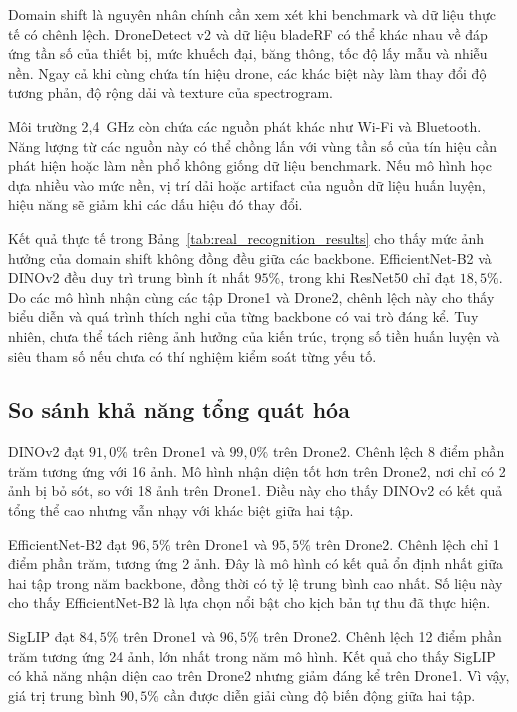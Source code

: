 \documentclass[../DoAn.tex]{subfiles}
\begin{document}
Domain shift là nguyên nhân chính cần xem xét khi benchmark và dữ liệu thực tế có chênh lệch. DroneDetect v2 và dữ liệu bladeRF có thể khác nhau về đáp ứng tần số của thiết bị, mức khuếch đại, băng thông, tốc độ lấy mẫu và nhiễu nền. Ngay cả khi cùng chứa tín hiệu drone, các khác biệt này làm thay đổi độ tương phản, độ rộng dải và texture của spectrogram.

Môi trường 2,4~GHz còn chứa các nguồn phát khác như Wi-Fi và Bluetooth. Năng lượng từ các nguồn này có thể chồng lấn với vùng tần số của tín hiệu cần phát hiện hoặc làm nền phổ không giống dữ liệu benchmark. Nếu mô hình học dựa nhiều vào mức nền, vị trí dải hoặc artifact của nguồn dữ liệu huấn luyện, hiệu năng sẽ giảm khi các dấu hiệu đó thay đổi.

Kết quả thực tế trong Bảng~\ref{tab:real_recognition_results} cho thấy mức ảnh hưởng của domain shift không đồng đều giữa các backbone. EfficientNet-B2 và DINOv2 đều duy trì trung bình ít nhất $95\%$, trong khi ResNet50 chỉ đạt $18,5\%$. Do các mô hình nhận cùng các tập Drone1 và Drone2, chênh lệch này cho thấy biểu diễn và quá trình thích nghi của từng backbone có vai trò đáng kể. Tuy nhiên, chưa thể tách riêng ảnh hưởng của kiến trúc, trọng số tiền huấn luyện và siêu tham số nếu chưa có thí nghiệm kiểm soát từng yếu tố.

\subsection{So sánh khả năng tổng quát hóa}

DINOv2 đạt $91,0\%$ trên Drone1 và $99,0\%$ trên Drone2. Chênh lệch 8 điểm phần trăm tương ứng với 16 ảnh. Mô hình nhận diện tốt hơn trên Drone2, nơi chỉ có 2 ảnh bị bỏ sót, so với 18 ảnh trên Drone1. Điều này cho thấy DINOv2 có kết quả tổng thể cao nhưng vẫn nhạy với khác biệt giữa hai tập.

EfficientNet-B2 đạt $96,5\%$ trên Drone1 và $95,5\%$ trên Drone2. Chênh lệch chỉ 1 điểm phần trăm, tương ứng 2 ảnh. Đây là mô hình có kết quả ổn định nhất giữa hai tập trong năm backbone, đồng thời có tỷ lệ trung bình cao nhất. Số liệu này cho thấy EfficientNet-B2 là lựa chọn nổi bật cho kịch bản tự thu đã thực hiện.

SigLIP đạt $84,5\%$ trên Drone1 và $96,5\%$ trên Drone2. Chênh lệch 12 điểm phần trăm tương ứng 24 ảnh, lớn nhất trong năm mô hình. Kết quả cho thấy SigLIP có khả năng nhận diện cao trên Drone2 nhưng giảm đáng kể trên Drone1. Vì vậy, giá trị trung bình $90,5\%$ cần được diễn giải cùng độ biến động giữa hai tập.
\end{document}
